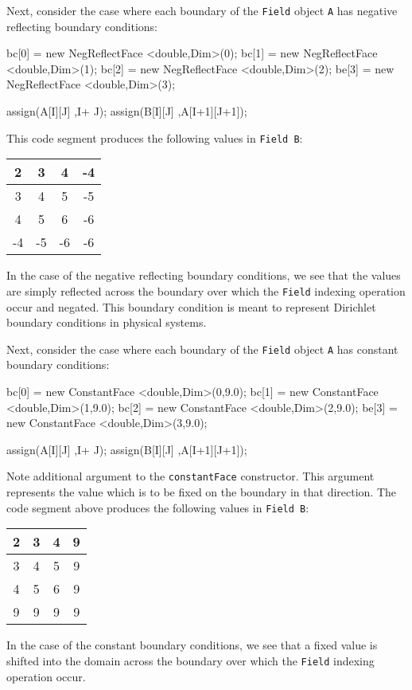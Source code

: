 Next, consider the case where each boundary of the \texttt{Field} object \texttt{A} has negative reflecting boundary conditions:
\begin{smallcode}
bc[0] = new NegReflectFace <double,Dim>(0); 
bc[1] = new NegReflectFace <double,Dim>(1); 
bc[2] = new NegReflectFace <double,Dim>(2);
be[3] = new NegReflectFace <double,Dim>(3);

assign(A[I][J] ,I+ J); 
assign(B[I][J] ,A[I+1][J+1]);
\end{smallcode}
This code segment produces the following values in \texttt{Field B}: 
\begin{center}
        \begin{tabular}{|c|c|c|c|}
        \hline
        2 & 3 & 4 & -4 \\        \hline
        3 & 4 & 5 & -5 \\        \hline
        4 & 5 & 6 & -6 \\        \hline
         -4 & -5 & -6 & -6 \\        \hline	
        \end{tabular}
   \label{tbl:t4}
\end{center}
In the case of the negative reflecting boundary conditions, we see that the values are simply reflected across the boundary over which the \texttt{Field} indexing operation occur and negated. 
This boundary condition is meant to represent Dirichlet boundary conditions in physical systems. 


Next, consider the case where each boundary of the \texttt{Field} object \texttt{A} has constant boundary conditions: 
\begin{smallcode}
bc[0] = new ConstantFace <double,Dim>(0,9.0); 
bc[1] = new ConstantFace <double,Dim>(1,9.0); 
bc[2] = new ConstantFace <double,Dim>(2,9.0);
be[3] = new ConstantFace <double,Dim>(3,9.0);

assign(A[I][J] ,I+ J); 
assign(B[I][J] ,A[I+1][J+1]);
\end{smallcode}
Note additional argument to the \texttt{constantFace} constructor. This argument represents the value which is to be fixed on the boundary in that direction. 
The code segment above produces the following values in \texttt{Field B}: 
\begin{center}
        \begin{tabular}{|c|c|c|c|}
        \hline
        2 & 3 & 4 & 9 \\        \hline
        3 & 4 & 5 & 9 \\        \hline
        4 & 5 & 6 & 9 \\        \hline
         9 & 9 & 9 & 9 \\        \hline	
        \end{tabular}
   \label{tbl:t5}
\end{center}
In the case of the constant boundary conditions, we see that a fixed value is shifted into the domain across the boundary over which the \texttt{Field} indexing operation occur. 

